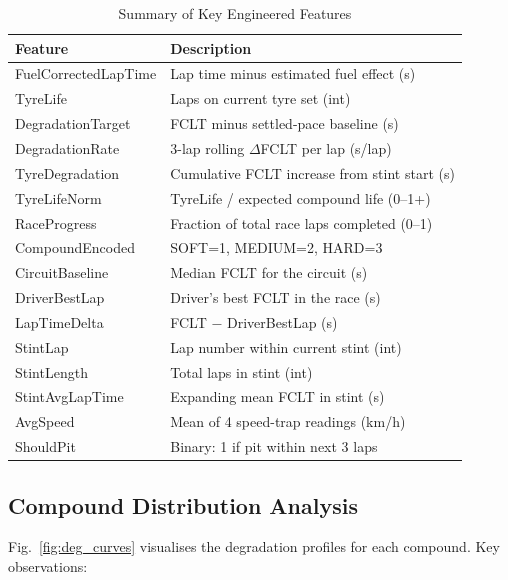 \documentclass[journal,twoside]{IEEEtran}
\begin{document}
\begin{table}[!t]
\caption{Summary of Key Engineered Features}
\label{tab:features}
\centering
\footnotesize
\begin{tabular}{@{}lp{5cm}@{}}
\toprule
\textbf{Feature} & \textbf{Description} \\
\midrule
FuelCorrectedLapTime    & Lap time minus estimated fuel effect (s) \\
TyreLife                & Laps on current tyre set (int) \\
DegradationTarget       & FCLT minus settled-pace baseline (s) \\
DegradationRate         & 3-lap rolling $\Delta$FCLT per lap (s/lap) \\
TyreDegradation         & Cumulative FCLT increase from stint start (s) \\
TyreLifeNorm            & TyreLife / expected compound life (0--1+) \\
RaceProgress            & Fraction of total race laps completed (0--1) \\
CompoundEncoded         & SOFT=1, MEDIUM=2, HARD=3 \\
CircuitBaseline         & Median FCLT for the circuit (s) \\
DriverBestLap           & Driver's best FCLT in the race (s) \\
LapTimeDelta            & FCLT $-$ DriverBestLap (s) \\
StintLap                & Lap number within current stint (int) \\
StintLength             & Total laps in stint (int) \\
StintAvgLapTime         & Expanding mean FCLT in stint (s) \\
AvgSpeed                & Mean of 4 speed-trap readings (km/h) \\
ShouldPit               & Binary: 1 if pit within next 3 laps \\
\bottomrule
\end{tabular}
\end{table}

\subsection{Compound Distribution Analysis}

Fig.~\ref{fig:deg_curves} visualises the degradation profiles for each
compound.  Key observations:
\end{document}
